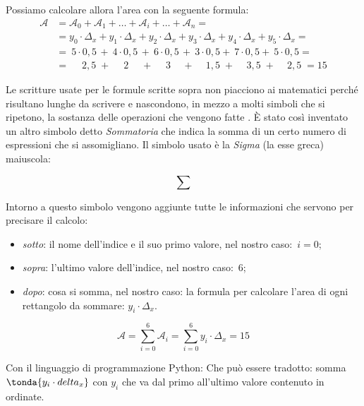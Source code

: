 Possiamo calcolare allora l'area con la seguente formula:
\begin{align*}
  \mathcal{A} &= \mathcal{A}_0 + \mathcal{A}_1 + \dots + 
                 \mathcal{A}_i + \dots + \mathcal{A}_n = \\
              &= y_0 \cdot \Delta_x + y_1 \cdot \Delta_x + 
                 y_2 \cdot \Delta_x + y_3 \cdot \Delta_x + 
                 y_4 \cdot \Delta_x + y_5 \cdot \Delta_x = \\
              &= ~5 \cdot 0,5\, + ~4 \cdot 0,5\, + ~6 \cdot 0,5\, + 
                 ~3 \cdot 0,5 + ~7 \cdot 0,5 + ~5 \cdot 0,5 = \\
              &= \quad\; 2,5 \; + \quad\; 2 \quad\; + \quad\; 3 \quad\, + 
                 \quad\, 1,5 \; + \quad\, 3,5 \; + \quad\, 2,5 \; = 15
\end{align*}

Le scritture usate per le formule scritte sopra non piacciono ai matematici 
perché risultano lunghe da scrivere e nascondono, 
in mezzo a molti simboli che si ripetono, 
la sostanza delle operazioni che vengono fatte . 
È stato così inventato un altro simbolo detto 
\emph{Sommatoria} che indica la somma di un certo numero di espressioni che 
si assomigliano. Il simbolo usato è la \emph{Sigma} (la esse greca) maiuscola:

\[\sum\]

Intorno a questo simbolo vengono aggiunte tutte le informazioni che servono 
per precisare il calcolo:

\begin{itemize} [nosep]
 \item \emph{sotto}: il nome dell'indice e il suo primo valore, nel nostro 
caso:~\(i=0\);
 \item \emph{sopra}: l'ultimo valore dell'indice, nel nostro caso:~6;
 \item \emph{dopo}: cosa si somma, nel nostro caso: la formula per calcolare 
l'area di ogni rettangolo da sommare: \(y_i \cdot \Delta_x\).
\end{itemize}

\[\mathcal{A} = \sum_{i=0}^6 \mathcal{A}_i = 
                \sum_{i=0}^6 y_i \cdot \Delta_x = 15\]

\ifcoding
Con il linguaggio di programmazione Python:
Che può essere tradotto: somma 
\(\tonda{y_i \cdot delta_x}\) con \(y_i\) che va 
dal primo all'ultimo valore contenuto in ordinate.
\fi

